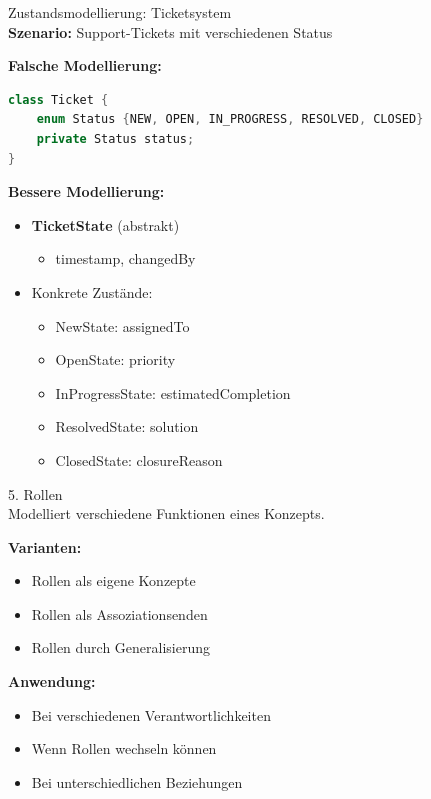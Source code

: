 \begin{example2}{Zustandsmodellierung: Ticketsystem}\\
\textbf{Szenario:} Support-Tickets mit verschiedenen Status

\textbf{Falsche Modellierung:}
\begin{lstlisting}[language=Java, style=base]
class Ticket {
    enum Status {NEW, OPEN, IN_PROGRESS, RESOLVED, CLOSED}
    private Status status;
}
\end{lstlisting}

\textbf{Bessere Modellierung:}
\begin{itemize}
    \item \textbf{TicketState} (abstrakt)
    \begin{itemize}
        \item timestamp, changedBy
    \end{itemize}
    \item Konkrete Zustände:
    \begin{itemize}
        \item NewState: assignedTo
        \item OpenState: priority
        \item InProgressState: estimatedCompletion
        \item ResolvedState: solution
        \item ClosedState: closureReason
    \end{itemize}
\end{itemize}
\end{example2}

\begin{concept}{5. Rollen}\\
Modelliert verschiedene Funktionen eines Konzepts.

\textbf{Varianten:}
\begin{itemize}
    \item Rollen als eigene Konzepte
    \item Rollen als Assoziationsenden
    \item Rollen durch Generalisierung
\end{itemize}

\textbf{Anwendung:}
\begin{itemize}
    \item Bei verschiedenen Verantwortlichkeiten
    \item Wenn Rollen wechseln können
    \item Bei unterschiedlichen Beziehungen
\end{itemize}
\end{concept}


